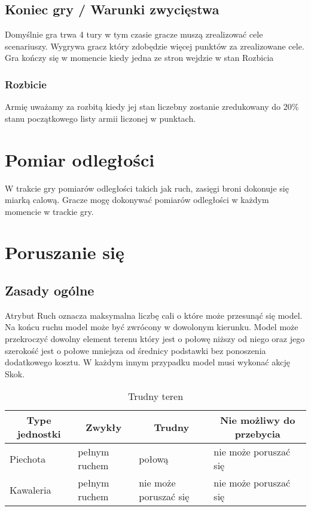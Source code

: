 \subsection{Koniec gry / Warunki zwycięstwa}
Domyślnie gra trwa 4 tury w tym czasie gracze muszą zrealizować cele scenariuszy. Wygrywa gracz który zdobędzie więcej punktów za zrealizowane cele.  Gra kończy się w momencie kiedy jedna ze stron wejdzie w stan Rozbicia

\subsubsection{Rozbicie}
\label{sec:link_rozbicie}
Armię uważamy za rozbitą kiedy jej stan liczebny zostanie zredukowany do 20\% stanu początkowego listy armii liczonej w punktach. 
\section{Pomiar odległości}
W trakcie gry pomiarów odległości takich jak ruch, zasięgi broni dokonuje się miarką calową. Gracze mogę dokonywać pomiarów odległości w każdym momencie w trackie gry. 

\section{Poruszanie się}
\subsection{Zasady ogólne}
Atrybut Ruch oznacza maksymalna liczbę cali o które może przesunąć się model. Na końcu ruchu model może być zwrócony w dowolonym kierunku. Model może przekroczyć dowolny element terenu który jest o połowę niższy od niego oraz jego szerokość jest o połowe mniejsza od średnicy podstawki bez ponoszenia dodatkowego kosztu. W każdym innym przypadku model musi wykonać akcję Skok. 

\begin{table}[h]
\caption{Trudny teren}
\begin{tabular}{|l|l|l|l|}
\hline
\multicolumn{1}{c}{Type jednostki} & \multicolumn{1}{c}{Zwykły} & \multicolumn{1}{c}{Trudny} & \multicolumn{1}{c}{Nie możliwy do przebycia} \\ \hline
Piechota & pełnym ruchem & połową & nie może poruszać się \\ \hline
Kawaleria & pełnym ruchem & nie może poruszać się & nie może poruszać się \\ \hline
\end{tabular}

\end{table}

